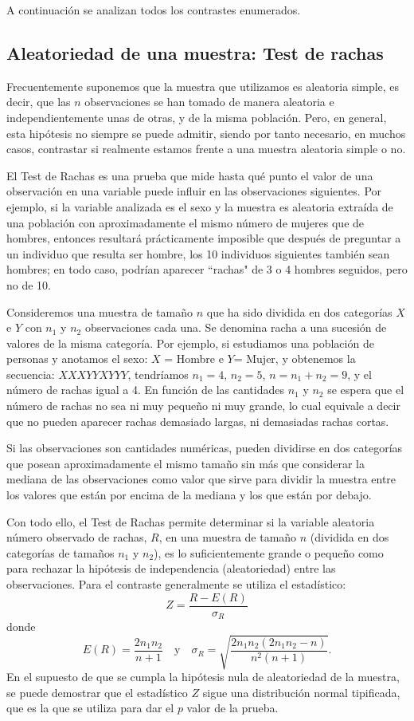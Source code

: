 \begin{description}
A continuación se analizan todos los contrastes enumerados.

\subsection{Aleatoriedad de una muestra: Test de rachas}
Frecuentemente suponemos que la muestra que utilizamos es aleatoria simple, es decir, que las  $n$  observaciones se han tomado de manera aleatoria e independientemente unas de otras, y de la misma población. Pero, en general, esta hipótesis no siempre se puede admitir, siendo por tanto necesario, en muchos casos, contrastar si realmente estamos frente a una muestra aleatoria simple o no.

El Test de Rachas es una prueba que mide hasta qué punto el valor de una observación en una variable puede influir en las observaciones siguientes. Por ejemplo, si la variable analizada es el sexo y la muestra es aleatoria extraída de una población con aproximadamente el mismo número de mujeres que de hombres, entonces resultará prácticamente imposible que después de preguntar a un individuo que resulta ser hombre, los 10 individuos siguientes también sean hombres; en todo caso, podrían aparecer ``rachas" de 3 o 4 hombres seguidos, pero no de 10.

Consideremos una muestra de tamaño $n$ que ha sido dividida en dos categorías $X$ e $Y$ con $n_{1}$ y $n_{2}$ observaciones cada una. Se denomina racha a una sucesión de valores de la misma categoría. Por ejemplo, si estudiamos una población de personas y anotamos el sexo: $X$ = Hombre e $Y$= Mujer, y obtenemos la secuencia: $X X X Y Y X Y Y Y$, tendríamos $n_{1}=4$, $n_{2}=5$, $n=n_{1}+n_{2}=9$, y el número de rachas igual a 4. En función de las cantidades $n_{1}$ y $n_{2}$ se espera que el número de rachas no sea ni muy pequeño ni muy grande, lo cual equivale a decir que no pueden aparecer rachas demasiado largas, ni demasiadas rachas cortas.

Si las observaciones son cantidades numéricas, pueden dividirse en dos categorías que posean aproximadamente el mismo tamaño sin más que considerar la mediana de las observaciones como valor que sirve para dividir la muestra entre los valores que están por encima de la mediana y los que están por debajo.

Con todo ello, el Test de Rachas permite determinar si la variable aleatoria número observado de rachas, $R$, en una muestra de tamaño $n$ (dividida en dos categorías de tamaños $n_1$ y $n_2$), es lo suficientemente grande o pequeño como para rechazar la hipótesis de independencia (aleatoriedad) entre las observaciones. Para el contraste generalmente se utiliza el estadístico:
\[
Z = \frac{R-E(R)}{\sigma_R}
\]
donde
\[
E(R) = \frac{2n_1n_2}{n+1}
\quad \textrm{y}\quad
\sigma_R = \sqrt{\frac{2n_1n_2(2n_1n_2-n)}{n^2(n+1)}}.
\]
En el supuesto de que se cumpla la hipótesis nula de aleatoriedad de la muestra, se puede demostrar que el estadístico $Z$ sigue una distribución normal tipificada, que es la que se utiliza para dar el $p$ valor de la prueba.


\end{description}
